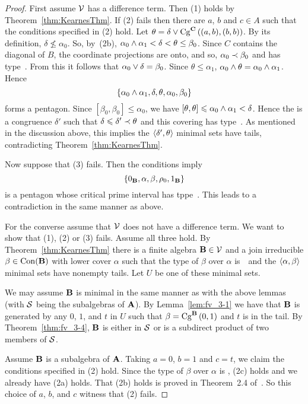 \begin{proof}
First assume $\sV$ has a difference term.
Then (1) holds by Theorem~\ref{thm:KearnesThm}.
If (2) fails then there are $a$, $b$ and $c\in A$ such
that the conditions specified in (2) hold. 
Let $\theta = \delta \join \Cga {(a,b)}{(b,b)} C$. 
By its definition, $\delta \nleq \alpha_0$.
So, by~(2b), $\alpha_0\meet\alpha_1 < \delta < \theta \le \beta_0$.
Since $C$ contains the diagonal of $B$, the coordinate
projections are onto, and so, $\alpha_0 \cov \beta_0$ and has type~\atyp. 
From this it follows that $\alpha_0 \join \delta = \beta_0$.
Since $\theta \le \alpha_1$, $\alpha_0 \meet \theta = \alpha_0\meet\alpha_1$.
Hence
\[
\{\alpha_0\meet\alpha_1, \delta, \theta, \alpha_0, \beta_0 \}
\]
forms a pentagon.
Since $[\beta_0,\beta_0] \leq \alpha_0$, we have
$[\theta,\theta] \leq \alpha_0\meet\alpha_1 < \delta$.
Hence the is a congruence $\delta'$ such that 
$\delta\leq \delta' \cov \theta$ and this covering has
type~\atyp.
As mentioned in the discussion above, this implies the
$\la \delta',\theta\ra$ minimal sets have tails, contradicting
Theorem~\ref{thm:KearnesThm}.

Now suppose that (3) fails. Then the conditions imply
\[
\{0_{\alg B}, \alpha, \beta, \rho_0, 1_{\alg B} \}
\]
is a pentagon whose critical prime interval has tppe~\atyp. This 
leads to a contradiction in the same manner as above.

For the converse assume that $\sV$ does not have a difference 
term. 
We want to show that (1), (2) or (3) fails. Assume all three hold.
By Theorem~\ref{thm:KearnesThm} there is a finite 
algebra $\alg B \in \sV$ and a join irreducible 
$\beta \in \op{Con}(\alg B)$ with lower cover 
$\alpha$ such that the type of $\beta$ over $\alpha$ is~\atyp\
and the $\la\alpha,\beta\ra$ minimal sets have
nonempty tails. Let $U$ be one of these minimal sets.


We may assume $\alg B$ is minimal in the same manner as with the
above lemmas (with $\sS$ being the subalgebras of $\alg A$).
By Lemma~\ref{lem:fv_3-1} 
we have that $\alg B$ is generated by any $0$, $1$, and $t$ in
$U$ such
that $\beta = \Cga 01{B}$ and $t$ is in the tail. By 
Theorem~\ref{thm:fv_3-4}, $\alg B$ is either 
in $\sS$ or is a subdirect product of two members of $\sS$.

Assume $\alg B$ is a subalgebra of $\alg A$. Taking 
$a=0$, $b=1$ and $c=t$, we claim the conditions specified
in (2) hold. 
Since the type of $\beta$ over $\alpha$ is \atyp,
(2c) holds and we already have (2a) holds. 
That (2b) holds is proved in Theorem~2.4 of~\cite{KearnesKiss1999}.
So this choice of $a$, $b$, and $c$ witness that (2) fails.





\end{proof}
